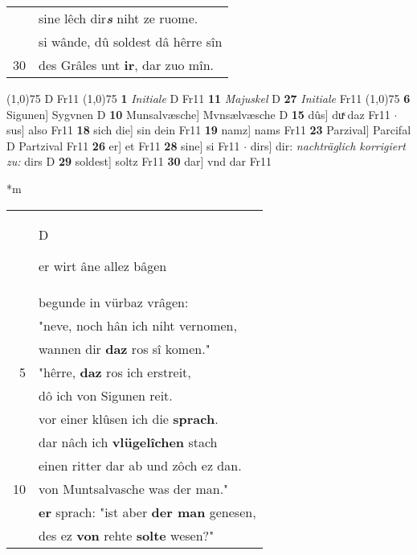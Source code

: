 \documentclass[8pt,a4paper,notitlepage]{article}
\begin{document}
\begin{table}[ht]
\begin{minipage}[t]{0.5\linewidth}
\begin{tabular}{rl}
 & sine lêch dir\textit{\textbf{s}} niht ze ruome.\\ 
 & si wânde, dû soldest dâ hêrre sîn\\ 
30 & des Grâles unt \textbf{ir}, dar zuo mîn.\\ 
\end{tabular}
\scriptsize
\line(1,0){75} \newline
D Fr11 \newline
\line(1,0){75} \newline
\textbf{1} \textit{Initiale} D Fr11  \textbf{11} \textit{Majuskel} D  \textbf{27} \textit{Initiale} Fr11  \newline
\line(1,0){75} \newline
\textbf{6} Sigunen] Sygvnen D \textbf{10} Munsalvæsche] Mvnsælvæsche D \textbf{15} dûs] duͯ daz Fr11  $\cdot$ sus] also Fr11 \textbf{18} sich die] sin dein Fr11 \textbf{19} namz] nams Fr11 \textbf{23} Parzival] Parcifal D Partzival Fr11 \textbf{26} er] et Fr11 \textbf{28} sine] si Fr11  $\cdot$ dirs] dir: \textit{nachträglich korrigiert zu:} dirs D \textbf{29} soldest] soltz Fr11 \textbf{30} dar] vnd dar Fr11 \newline
\end{minipage}
\hspace{0.5cm}
\begin{minipage}[t]{0.5\linewidth}
\small
\begin{center}*m
\end{center}
\begin{tabular}{rl}
 & \begin{large}D\end{large}er wirt âne allez bâgen\\ 
 & begunde in vürbaz vrâgen:\\ 
 & "neve, noch hân ich niht vernomen,\\ 
 & wannen dir \textbf{daz} ros sî komen."\\ 
5 & "hêrre, \textbf{daz} ros ich erstreit,\\ 
 & dô ich von Sigunen reit.\\ 
 & vor einer klûsen ich die \textbf{sprach}.\\ 
 & dar nâch ich \textbf{vlügelîchen} stach\\ 
 & einen ritter dar ab und zôch ez dan.\\ 
10 & von Muntsalvasche was der man."\\ 
 & \textbf{er} sprach: "ist aber \textbf{der man} genesen,\\ 
 & des ez \textbf{von} rehte \textbf{solte} wesen?"\\ 

\end{tabular}
\end{minipage}
\end{table}
\end{document}
